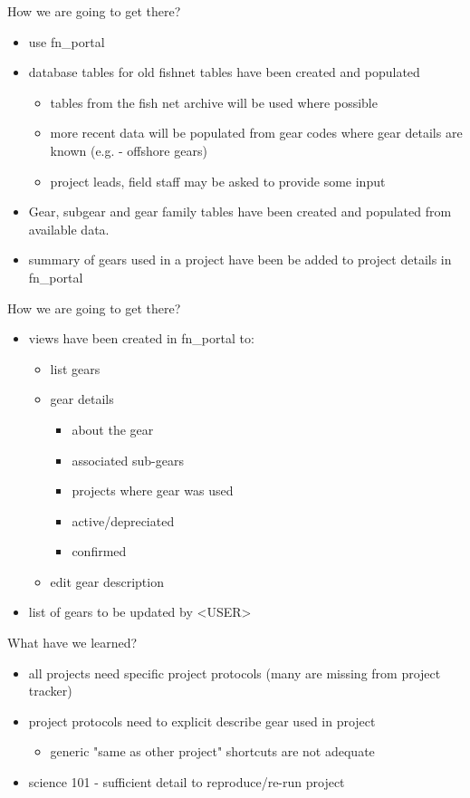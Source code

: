 \documentclass[bigger]{beamer}
\begin{document}
\begin{frame}[label=sec-12]{How we are going to get there?}
\begin{itemize}
\item use fn\_portal
\item database tables for old fishnet tables have been created and populated
\begin{itemize}
\item tables from the fish net archive will be used where possible
\item more recent data will be populated from gear codes where gear
details are known (e.g. - offshore gears)
\item project leads, field staff may be asked to provide some input
\end{itemize}

\item Gear, subgear and gear family tables have been created and populated
from available data.

\item summary of gears used in a project have been be added to project details
in fn\_portal
\end{itemize}
\end{frame}

\begin{frame}[label=sec-13]{How we are going to get there?}
\begin{itemize}
\item views have been created in fn\_portal to:
\begin{itemize}
\item list gears
\item gear details
\begin{itemize}
\item about the gear
\item associated sub-gears
\item projects where gear was used
\item active/depreciated
\item confirmed
\end{itemize}
\item edit gear description
\end{itemize}
\item list of gears to be updated by <USER>
\end{itemize}
\end{frame}

\begin{frame}[label=sec-14]{What have we learned?}
\begin{itemize}
\item all projects need specific project protocols (many are missing from
project tracker)
\item project protocols need to explicit describe gear used in project
\begin{itemize}
\item generic "same as other project" shortcuts are not adequate
\end{itemize}
\item science 101 - sufficient detail to reproduce/re-run project
\end{itemize}
\end{frame}
\end{document}
